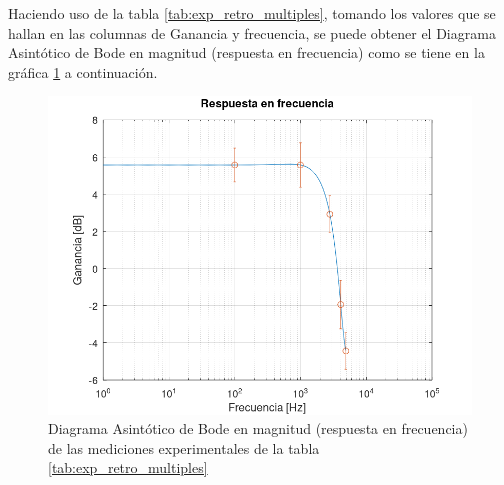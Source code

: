              Haciendo uso de la tabla \ref{tab:exp_retro_multiples}, tomando los valores que se hallan en las columnas de Ganancia y frecuencia, se puede obtener el Diagrama  Asintótico de Bode en magnitud (respuesta en frecuencia) como se tiene en la gráfica \ref{fig:resp_frec_retro_multiples} a continuación.

             \begin{figure}[H]
                \centering
                \renewcommand{\figurename}{Gráfica}
                \setcounter{figure}{41}
                \includegraphics[width=15cm]{Imagenes/resp_frec_retro_multiples.png}
                \caption{Diagrama  Asintótico de Bode en magnitud (respuesta en frecuencia) de las mediciones experimentales de la tabla \ref{tab:exp_retro_multiples}}
                \label{fig:resp_frec_retro_multiples}
            \end{figure}

